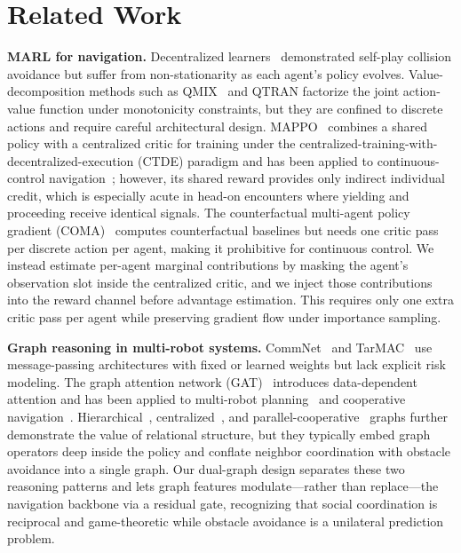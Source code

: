 \documentclass[journal,twoside,web]{ieeecolor}
\begin{document}
\section{Related Work}
\label{sec:related_work}

\textbf{MARL for navigation.} Decentralized learners~\cite{chen2017decentralized,long2018towards} demonstrated self-play collision avoidance but suffer from non-stationarity as each agent's policy evolves. Value-decomposition methods such as QMIX~\cite{rashid2018qmix} and QTRAN factorize the joint action-value function under monotonicity constraints, but they are confined to discrete actions and require careful architectural design. MAPPO~\cite{yu2022mappo} combines a shared policy with a centralized critic for training under the centralized-training-with-decentralized-execution (CTDE) paradigm and has been applied to continuous-control navigation~\cite{fan2020distributed}; however, its shared reward provides only indirect individual credit, which is especially acute in head-on encounters where yielding and proceeding receive identical signals. The counterfactual multi-agent policy gradient (COMA)~\cite{foerster2018coma} computes counterfactual baselines but needs one critic pass per discrete action per agent, making it prohibitive for continuous control. We instead estimate per-agent marginal contributions by masking the agent's observation slot inside the centralized critic, and we inject those contributions into the reward channel before advantage estimation. This requires only one extra critic pass per agent while preserving gradient flow under importance sampling.

\textbf{Graph reasoning in multi-robot systems.} CommNet~\cite{sukhbaatar2016commnet} and TarMAC~\cite{das2019tarmac} use message-passing architectures with fixed or learned weights but lack explicit risk modeling. The graph attention network (GAT)~\cite{velickovic2018gat} introduces data-dependent attention and has been applied to multi-robot planning~\cite{zhang2025gatmapf} and cooperative navigation~\cite{escudie2024multisoc,bi2025decentralized}. Hierarchical~\cite{liu2025cooperative}, centralized~\cite{xiao2024macns}, and parallel-cooperative~\cite{wong2024mrnppo} graphs further demonstrate the value of relational structure, but they typically embed graph operators deep inside the policy and conflate neighbor coordination with obstacle avoidance into a single graph. Our dual-graph design separates these two reasoning patterns and lets graph features modulate—rather than replace—the navigation backbone via a residual gate, recognizing that social coordination is reciprocal and game-theoretic while obstacle avoidance is a unilateral prediction problem.
\end{document}
